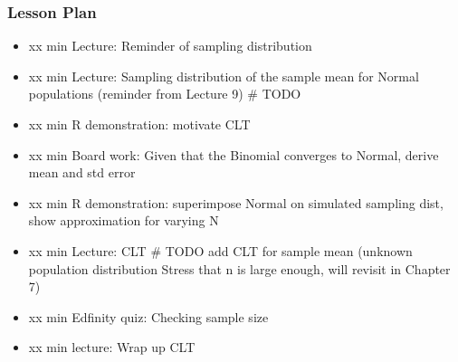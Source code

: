 

\begin{frame}
\frametitle{Lesson Plan}
\begin{itemize}
    \item xx min Lecture: Reminder of sampling distribution
    \item xx min Lecture: Sampling distribution of the sample mean for Normal populations (reminder from Lecture 9) # TODO
    \item xx min R demonstration: motivate CLT
    \item xx min Board work: Given that the Binomial converges to Normal, derive mean and std error
    \item xx min R demonstration: superimpose Normal on simulated sampling dist, show approximation for varying N
    \item xx min Lecture: CLT # TODO add CLT for sample mean (unknown population distribution Stress that n is large enough, will revisit in Chapter 7)
    \item xx min Edfinity quiz: Checking sample size
    \item xx min lecture: Wrap up CLT
 \end{itemize}
\end{frame}
    

